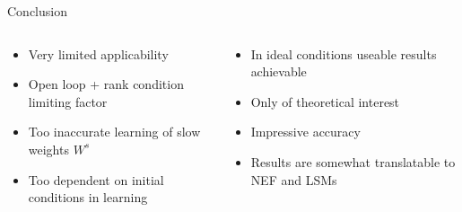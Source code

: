 \documentclass[17pt, t, lualatex]{beamer}
\begin{document}



\begin{frame}{Conclusion}
	\begin{columns}
		\begin{column}{0.45\textwidth}
			\begin{itemize}
				\setlength\itemsep{1.0em}
				\item Very limited applicability
				\item Open loop + rank condition limiting factor
				\item Too inaccurate learning of slow weights $W^s$
				\item Too dependent on initial conditions in learning
			\end{itemize}
		\end{column}
		\vrule
		\begin{column}{0.45\textwidth}
			\begin{itemize}
				\setlength\itemsep{1.0em}
				\item In ideal conditions useable results achievable
				\item Only of theoretical interest
				\item Impressive accuracy
				\item Results are somewhat translatable to NEF and LSMs
			\end{itemize}
		\end{column}
	\end{columns}
\end{frame}

\insertendpage
\end{document}

